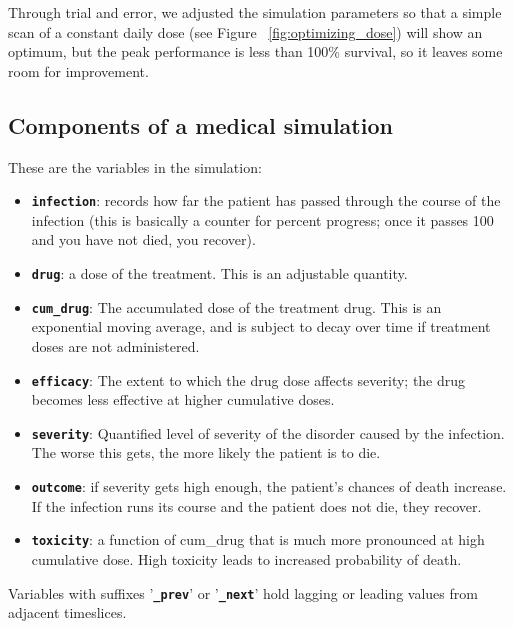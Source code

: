 Through trial and error, we adjusted the simulation parameters so that a simple scan of a constant daily dose (see Figure ~\ref{fig:optimizing_dose}) will show an optimum, but the peak performance is less than 100\% survival, so it leaves some room for improvement. 

\subsection{Components of a medical simulation}

These are the variables in the simulation: 
\begin{itemize}

\item \texttt{\bf infection}: records how far the patient has passed through the course of the infection (this is basically a counter for percent progress; once it passes 100 and you have not died, you recover).
\item \texttt{\bf drug}: a dose of the treatment. This is an adjustable quantity.
\item \texttt{\bf cum\_drug}: The accumulated dose of the treatment drug. This is an exponential moving average, and is subject to decay over time if treatment doses are not administered.
\item \texttt{\bf efficacy}: The extent to which the drug dose affects severity; the drug becomes less effective at higher cumulative doses.
\item \texttt{\bf severity}: Quantified level of severity of the disorder caused by the infection. The worse this gets, the more likely the patient is to die.
\item \texttt{\bf outcome}: if severity gets high enough, the patient's chances of death increase. If the infection runs its course and the patient does not die, they recover.
\item \texttt{\bf toxicity}: a function of cum\_drug that is much more pronounced at high cumulative dose. High toxicity leads to increased probability of death.

\end{itemize}

Variables with suffixes '\texttt{\bf \_prev}' or '\texttt{\bf \_next}' hold lagging  or leading values from adjacent timeslices.

